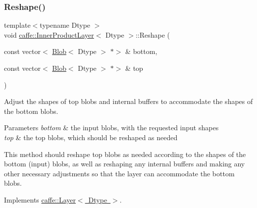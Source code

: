 \subsubsection{\texorpdfstring{Reshape()}{Reshape()}\hspace{0.1cm}{\footnotesize\ttfamily [1/2]}}
{\footnotesize\ttfamily template$<$typename Dtype $>$ \\
void \mbox{\hyperlink{classcaffe_1_1_inner_product_layer}{caffe\+::\+Inner\+Product\+Layer}}$<$ Dtype $>$\+::Reshape (\begin{DoxyParamCaption}\item[{const vector$<$ \mbox{\hyperlink{classcaffe_1_1_blob}{Blob}}$<$ Dtype $>$ $\ast$$>$ \&}]{bottom,  }\item[{const vector$<$ \mbox{\hyperlink{classcaffe_1_1_blob}{Blob}}$<$ Dtype $>$ $\ast$$>$ \&}]{top }\end{DoxyParamCaption})\hspace{0.3cm}{\ttfamily [virtual]}}



Adjust the shapes of top blobs and internal buffers to accommodate the shapes of the bottom blobs. 


\begin{DoxyParams}{Parameters}
{\em bottom} & the input blobs, with the requested input shapes \\
\hline
{\em top} & the top blobs, which should be reshaped as needed\\
\hline
\end{DoxyParams}
This method should reshape top blobs as needed according to the shapes of the bottom (input) blobs, as well as reshaping any internal buffers and making any other necessary adjustments so that the layer can accommodate the bottom blobs. 

Implements \mbox{\hyperlink{classcaffe_1_1_layer_a7fe981e8af8d93d587acf2a952be563d}{caffe\+::\+Layer$<$ Dtype $>$}}.

\mbox{\label{classcaffe_1_1_inner_product_layer_a12915397170ea81ccc0bce177897d4ba}} 
